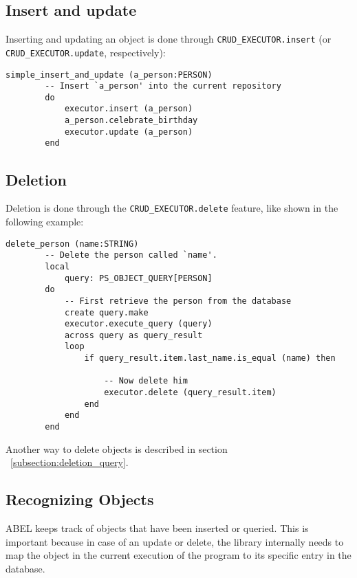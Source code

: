 \subsection{Insert and update}

Inserting and updating an object is done through \lstinline!CRUD_EXECUTOR.insert! (or \lstinline!CRUD_EXECUTOR.update!, respectively): 

\begin{lstlisting}[language=OOSC2Eiffel, captionpos=b, caption={}, label={lst:simple_insert}]
	simple_insert_and_update (a_person:PERSON)
		-- Insert `a_person' into the current repository
		do
			executor.insert (a_person)
			a_person.celebrate_birthday
			executor.update (a_person)
		end
\end{lstlisting}


\subsection{Deletion}
\label{subsection:simple_delete}

Deletion is done through the \lstinline!CRUD_EXECUTOR.delete! feature, like shown in the following example:

\begin{lstlisting}[language=OOSC2Eiffel, captionpos=b, caption={}, label={lst:simple_delete}]
	delete_person (name:STRING)
		-- Delete the person called `name'.
		local
			query: PS_OBJECT_QUERY[PERSON]
		do
			-- First retrieve the person from the database
			create query.make
			executor.execute_query (query)
			across query as query_result
			loop
				if query_result.item.last_name.is_equal (name) then

					-- Now delete him
					executor.delete (query_result.item)
				end
			end
		end
\end{lstlisting}

Another way to delete objects is described in section ~\ref{subsection:deletion_query}.

\subsection{Recognizing Objects}
\label{subsection:recognize_objects}

ABEL keeps track of objects that have been inserted or queried.
This is important because in case of an update or delete, the library internally needs to map the object in the current execution of the program to its specific entry in the database.

